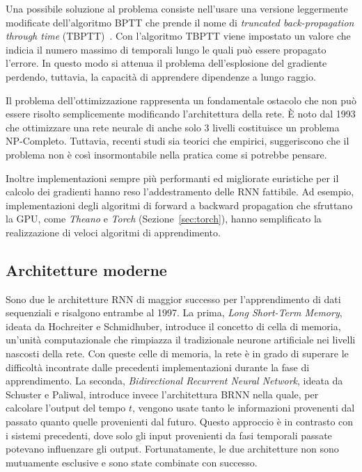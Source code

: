 Una possibile soluzione al problema consiste nell'usare una versione leggermente modificate dell'algoritmo BPTT che prende il nome di \emph{truncated back-propagation through time} (TBPTT)~\cite{Williams:1989}.
Con l'algoritmo TBPTT viene impostato un valore che indicia il numero massimo di temporali lungo le quali pu\`o essere propagato l'errore.
In questo modo si attenua il problema dell'esplosione del gradiente perdendo, tuttavia, la capacit\`a di apprendere dipendenze a lungo raggio.

Il problema dell'ottimizzazione rappresenta un fondamentale ostacolo che non pu\`o essere risolto semplicemente modificando l'architettura della rete.
\`E noto dal 1993 che ottimizzare una rete neurale di anche solo 3 livelli costituisce un problema NP-Completo.
Tuttavia, recenti studi sia teorici che empirici, suggeriscono che il problema non \`e cos\`i insormontabile nella pratica come si potrebbe pensare.

Inoltre implementazioni sempre pi\`u performanti ed migliorate euristiche per il calcolo dei gradienti hanno reso l'addestramento delle RNN fattibile.
Ad esempio, implementazioni degli algoritmi di forward a backward propagation che sfruttano la GPU, come \emph{Theano} e \emph{Torch} (Sezione~\ref{sec:torch}), hanno semplificato la realizzazione di veloci algoritmi di apprendimento.

\subsection{Architetture moderne}
Sono due le architetture RNN di maggior successo per l'apprendimento di dati sequenziali e risalgono entrambe al 1997.
La prima, \emph{Long Short-Term Memory}, ideata da Hochreiter e Schmidhuber, introduce il concetto di cella di memoria, un'unit\`a computazionale che rimpiazza il tradizionale neurone artificiale nei livelli nascosti della rete.
Con queste celle di memoria, la rete \`e in grado di superare le difficolt\`a incontrate dalle precedenti implementazioni durante la fase di apprendimento.
La seconda, \emph{Bidirectional Recurrent Neural Network}, ideata da Schuster e Paliwal, introduce invece l'architettura BRNN nella quale, per calcolare l'output del tempo $t$, vengono usate tanto le informazioni provenenti dal passato quanto quelle provenienti dal futuro.
Questo approccio \`e in contrasto con i sistemi precedenti, dove solo gli input provenienti da fasi temporali passate potevano influenzare gli output.
Fortunatamente, le due architetture non sono mutuamente esclusive e sono state combinate con successo.

